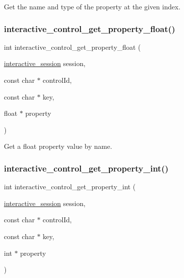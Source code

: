 Get the name and type of the property at the given index. 

\mbox{\label{group___interactivity_gab50af35e6041bdc529eb8967f3c063d0}} 
\subsubsection{\texorpdfstring{interactive\+\_\+control\+\_\+get\+\_\+property\+\_\+float()}{interactive\_control\_get\_property\_float()}}
{\footnotesize\ttfamily int interactive\+\_\+control\+\_\+get\+\_\+property\+\_\+float (\begin{DoxyParamCaption}\item[{\mbox{\hyperlink{group___interactivity_ga6d8819d38b8dc8994a2299cf22a65a31}{interactive\+\_\+session}}}]{session,  }\item[{const char $\ast$}]{control\+Id,  }\item[{const char $\ast$}]{key,  }\item[{float $\ast$}]{property }\end{DoxyParamCaption})}



Get a {\ttfamily float} property value by name. 

\mbox{\label{group___interactivity_ga9aa662d8d4a7ab33f073a275e8bf6a3b}} 
\subsubsection{\texorpdfstring{interactive\+\_\+control\+\_\+get\+\_\+property\+\_\+int()}{interactive\_control\_get\_property\_int()}}
{\footnotesize\ttfamily int interactive\+\_\+control\+\_\+get\+\_\+property\+\_\+int (\begin{DoxyParamCaption}\item[{\mbox{\hyperlink{group___interactivity_ga6d8819d38b8dc8994a2299cf22a65a31}{interactive\+\_\+session}}}]{session,  }\item[{const char $\ast$}]{control\+Id,  }\item[{const char $\ast$}]{key,  }\item[{int $\ast$}]{property }\end{DoxyParamCaption})}



